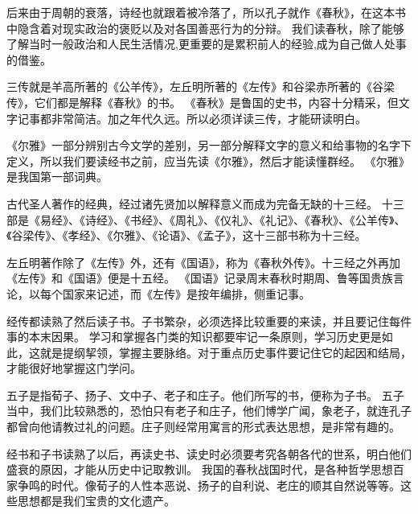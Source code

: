 \documentclass[avery5371,grid]{flashcards}
\begin{document}
{后来由于周朝的衰落，诗经也就跟着被冷落了，所以孔子就作《春秋》，在这本书中隐含着对现实政治的褒贬以及对各国善恶行为的分辩。} %
{我们读春秋，除了能够了解当时一般政治和人民生活情况,更重要的是累积前人的经验,成为自己做人处事的借鉴。} %

{三传就是羊高所著的《公羊传》，左丘明所著的《左传》和谷梁赤所著的《谷梁传》，它们都是解释《春秋》的书。} %
{《春秋》是鲁国的史书，内容十分精采，但文字记事都非常简洁。加之年代久远。所以必须详读三传，才能研读明白。} %



{《尔雅》一部分辨别古今文学的差别，另一部分解释文字的意义和给事物的名字下定义，所以我们要读经书之前，应当先读《尔雅》，然后才能读懂群经。} %
{《尔雅》是我国第一部词典。} %

{古代圣人著作的经典，经过诸先贤加以解释意义而成为完备无缺的十三经。} %
{十三部是《易经》、《诗经》、《书经》、《周礼》、《仪礼》、《礼记》、《春秋》、《公羊传》、《谷梁传》、《孝经》、《尔雅》、《论语》、《孟子》，这十三部书称为十三经。} %

{左丘明著作除了《左传》外，还有《国语》，称为《春秋外传》。十三经之外再加《左传》和《国语》便是十五经。} %
{《国语》记录周末春秋时期周、鲁等国贵族言论，以每个国家来记述，而《左传》是按年编排，侧重记事。} %


{经传都读熟了然后读子书。子书繁杂，必须选择比较重要的来读，并且要记住每件事的本末因果。} %
{学习和掌握各门类的知识都要牢记一条原则，学习历史更是如此，这就是提纲挈领，掌握主要脉络。对于重点历史事件要记住它的起因和结局，才能很好地掌握这门学问。} %

{五子是指荀子、扬子、文中子、老子和庄子。他们所写的书，便称为子书。} %
{五子当中，我们比较熟悉的，恐怕只有老子和庄子，他们博学广闻，象老子，就连孔子都曾向他请教过礼的问题。庄子则经常用寓言的形式表达思想，是非常有趣的。} %


{经书和子书读熟了以后，再读史书、读史时必须要考究各朝各代的世系，明白他们盛衰的原因，才能从历史中记取教训。} %
{我国的春秋战国时代，是各种哲学思想百家争鸣的时代。像荀子的人性本恶说、扬子的自利说、老庄的顺其自然说等等。这些思想都是我们宝贵的文化遗产。} %
\end{document}
